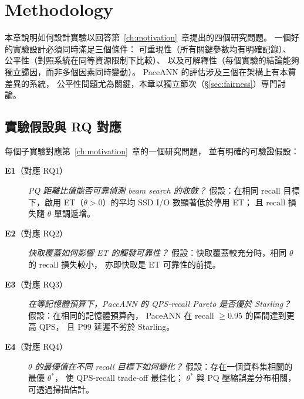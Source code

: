 \chapter{Methodology}
\label{ch:method}

本章說明如何設計實驗以回答第~\ref{ch:motivation}~章提出的四個研究問題。
一個好的實驗設計必須同時滿足三個條件：
可重現性（所有關鍵參數均有明確記錄）、
公平性（對照系統在同等資源限制下比較）、
以及可解釋性（每個實驗的結論能夠獨立歸因，而非多個因素同時變動）。
PaceANN 的評估涉及三個在架構上有本質差異的系統，
公平性問題尤為關鍵，本章以獨立節次（§\ref{sec:fairness}）專門討論。

\section{實驗假設與 RQ 對應}
\label{sec:hypotheses}

每個子實驗對應第~\ref{ch:motivation}~章的一個研究問題，
並有明確的可驗證假設：

\begin{description}
  \item[\textbf{E1}（對應 RQ1）]
    \emph{PQ 距離比值能否可靠偵測 beam search 的收斂？}
    假設：在相同 recall 目標下，啟用 ET（$\theta > 0$）的平均 SSD I/O 數顯著低於停用 ET；
    且 recall 損失隨 $\theta$ 單調遞增。

  \item[\textbf{E2}（對應 RQ2）]
    \emph{快取覆蓋如何影響 ET 的觸發可靠性？}
    假設：快取覆蓋較充分時，相同 $\theta$ 的 recall 損失較小，
    亦即快取是 ET 可靠性的前提。

  \item[\textbf{E3}（對應 RQ3）]
    \emph{在等記憶體預算下，PaceANN 的 QPS-recall Pareto 是否優於 Starling？}
    假設：在相同的記憶體預算內，
    PaceANN 在 recall $\geq 0.95$ 的區間達到更高 QPS，
    且 P99 延遲不劣於 Starling。

  \item[\textbf{E4}（對應 RQ4）]
    \emph{$\theta$ 的最優值在不同 recall 目標下如何變化？}
    假設：存在一個資料集相關的最優 $\theta^*$，
    使 QPS-recall trade-off 最佳化；
    $\theta^*$ 與 PQ 壓縮誤差分布相關，可透過掃描估計。
\end{description}

